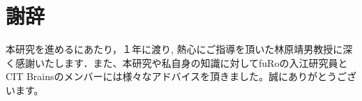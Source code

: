\chapter*{謝辞}

本研究を進めるにあたり，１年に渡り, 熱心にご指導を頂いた林原靖男教授に深く感謝いたします．また、本研究や私自身の知識に対してfuRoの入江研究員とCIT Brainsのメンバーには様々なアドバイスを頂きました。誠にありがとうございます。
